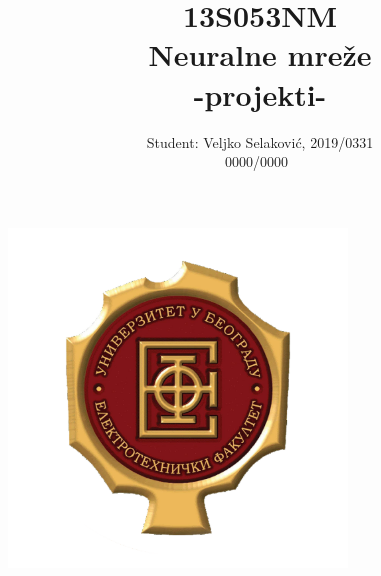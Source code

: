 \title{\Large 13S053NM  \\[0.5cm]
        \bf\Large Neuralne mreže \\ -projekti-}
\author{\large Student: Veljko Selaković, 2019/0331\\
                \hspace{4.7cm} 0000/0000\ \\}

\makeatletter
    \begin{titlepage}
        \begin{center}
	   { \includegraphics[width=9cm]{etflogo.png}}
	   {\ \\ \ \\}
        \vbox{}\vspace{5cm}
            {\@title }\\[3cm] 
            {\@author}
            

        \end{center}
    \end{titlepage}
\makeatother